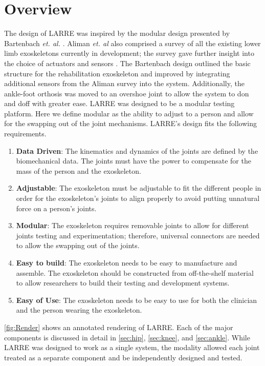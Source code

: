 \section{Overview}
The design of LARRE was inspired by the modular design presented by Bartenbach \textit{et. al.} \cite{7523699}.  Aliman \textit{et. al} also comprised a survey of all the existing lower limb exoskeletons currently in development; the survey gave further insight into the choice of actuators and sensors \cite{aliman2017design}. The Bartenbach design outlined the basic structure for the rehabilitation exoskeleton and improved by integrating additional sensors from the Aliman survey into the system. Additionally, the ankle-foot orthosis was moved to an overshoe joint to allow the system to don and doff with greater ease.
LARRE was designed to be a modular testing platform. Here we define modular as the ability to adjust to a person and allow for the swapping out of the joint mechanisms. LARRE's design fits the following requirements. 


\begin{enumerate}[noitemsep]
\item \textbf{Data Driven}: The kinematics and dynamics of the joints are defined by the biomechanical data. The joints must have the power to compensate for the mass of the person and the exoskeleton. 
\item \textbf{Adjustable}: The exoskeleton must be adjustable to fit the different people in order for the exoskeleton's joints to align properly to avoid putting unnatural force on a person's joints. 
\item \textbf{Modular}: The exoskeleton requires removable joints to allow for different joints testing and experimentation; therefore, universal connectors are needed to allow the swapping out of the joints. 
\item \textbf{Easy to build}: The exoskeleton needs to be easy to manufacture and assemble. The exoskeleton should be constructed from off-the-shelf material to allow researchers to build their testing and development systems. 
\item \textbf{Easy of Use}: The exoskeleton needs to be easy to use for both the clinician and the person wearing the exoskeleton. 
\end{enumerate}

 \autoref{fig:Render} shows an annotated rendering of LARRE.  Each of the major components is discussed in detail in  \autoref{sec:hip}, \autoref{sec:knee}, and \autoref{sec:ankle}. While LARRE was designed to work as a single system, the modality allowed each joint treated as a separate component and be independently designed and tested. 

